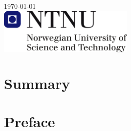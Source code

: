 \documentclass[12pt, a4paper, twoside, openright]{article}		%
\let\oldsection\section
\def\section{\cleardoublepage\oldsection}
\newcommand\blankpage{%
    \null
    \thispagestyle{empty}%
    \addtocounter{page}{-1}%
    \newpage}
\numberwithin{equation}{section}
\begin{document}
\begin{titlepage}


{\large \today}\\[3cm] %


\includegraphics[width=0.5\textwidth]{Figures/ntnu-logo.png} %
 

\vfill %

\end{titlepage}


\afterpage{\blankpage}

\section*{Summary}
\newpage

\section*{Preface}
\end{document}
